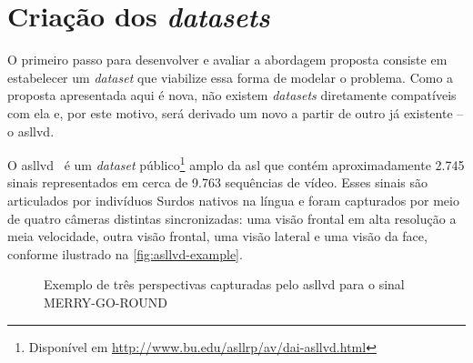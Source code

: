 \section{Criação dos \textit{datasets}}
\label{sec:metodos-datasets}

O primeiro passo para desenvolver e avaliar a abordagem proposta consiste em estabelecer um \textit{dataset} que viabilize essa forma de modelar o problema. Como a proposta apresentada aqui é nova, não existem \textit{datasets} diretamente compatíveis com ela e, por este motivo, será derivado um novo a partir de outro já existente -- o \acrfull{asllvd}.

O \acrshort{asllvd}~\cite{athitsos-2008-asllvd,neidle-2012-asllvd} é um \textit{dataset} público\footnote{Disponível em \url{http://www.bu.edu/asllrp/av/dai-asllvd.html}} amplo da \acrshort{asl} que contém aproximadamente 2.745 sinais representados em cerca de 9.763 sequências de vídeo. Esses sinais são articulados por indivíduos Surdos nativos na língua e foram capturados por meio de quatro câmeras distintas sincronizadas: uma visão frontal em alta resolução a meia velocidade, outra visão frontal, uma visão lateral e uma visão da face, conforme ilustrado na \autoref{fig:asllvd-example}.

\begin{figure}[ht!]
    \centering
    \caption{\textmd{Exemplo de três perspectivas capturadas pelo \acrshort{asllvd} para o sinal MERRY-GO-ROUND}}
    \label{fig:asllvd-example}
\end{figure}



